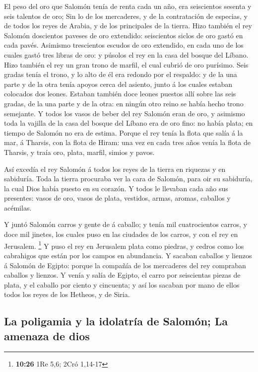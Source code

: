  El peso del oro que Salomón tenía de renta cada un año,
era seiscientos sesenta y seis talentos de oro;  Sin lo de
los mercaderes, y de la contratación de especias, y de todos los reyes
de Arabia, y de los principales de la tierra.  Hizo también
el rey Salomón doscientos paveses de oro extendido: seiscientos siclos
de oro gastó en cada pavés.  Asimismo trescientos escudos
de oro extendido, en cada uno de los cuales gastó tres libras de oro: y
púsolos el rey en la casa del bosque del Líbano.  Hizo
también el rey un gran trono de marfil, el cual cubrió de oro purísimo.
 Seis gradas tenía el trono, y lo alto de él era redondo
por el respaldo: y de la una parte y de la otra tenía apoyos cerca del
asiento, junto á los cuales estaban colocados dos leones. 
Estaban también doce leones puestos allí sobre las seis gradas, de la
una parte y de la otra: en ningún otro reino se había hecho trono
semejante.  Y todos los vasos de beber del rey Salomón eran
de oro, y asimismo toda la vajilla de la casa del bosque del Líbano era
de oro fino: no había plata; en tiempo de Salomón no era de estima.
 Porque el rey tenía la flota que salía á la mar, á
Tharsis, con la flota de Hiram: una vez en cada tres años venía la flota
de Tharsis, y traía oro, plata, marfil, simios y pavos.

 Así excedía el rey Salomón á todos los reyes de la tierra
en riquezas y en sabiduría.  Toda la tierra procuraba ver
la cara de Salomón, para oir su sabiduría, la cual Dios había puesto en
su corazón.  Y todos le llevaban cada año sus presentes:
vasos de oro, vasos de plata, vestidos, armas, aromas, caballos y
acémilas.

 Y juntó Salomón carros y gente de á caballo; y tenía mil
cuatrocientos carros, y doce mil jinetes, los cuales puso en las
ciudades de los carros, y con el rey en Jerusalem. \footnote{\textbf{10:26}
  1Re 5,6; 2Cró 1,14-17}  Y puso el rey en Jerusalem plata
como piedras, y cedros como los cabrahigos que están por los campos en
abundancia.  Y sacaban caballos y lienzos á Salomón de
Egipto: porque la compañía de los mercaderes del rey compraban caballos
y lienzos.  Y venía y salía de Egipto, el carro por
seiscientas piezas de plata, y el caballo por ciento y cincuenta; y así
los sacaban por mano de ellos todos los reyes de los Hetheos, y de
Siria.

\hypertarget{la-poligamia-y-la-idolatruxeda-de-salomuxf3n-la-amenaza-de-dios}{%
\subsection{La poligamia y la idolatría de Salomón; La amenaza de
dios}\label{la-poligamia-y-la-idolatruxeda-de-salomuxf3n-la-amenaza-de-dios}}

